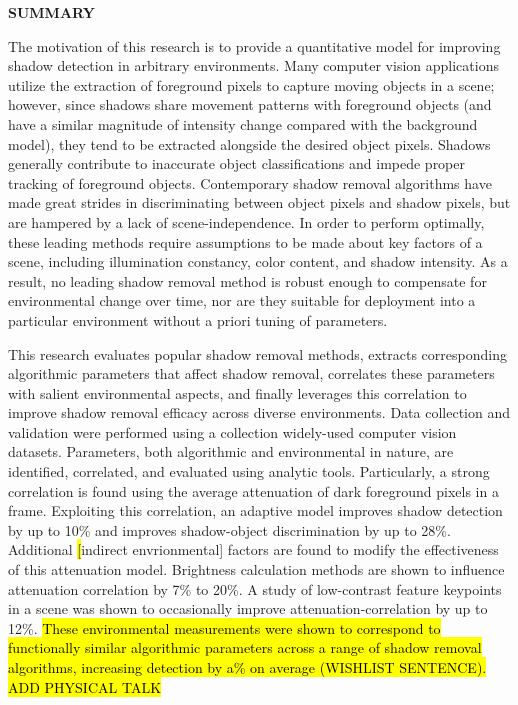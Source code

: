 \documentclass[12pt]{report}
\begin{document}
\doublespacing

\clearpage
\begin{centering}
\textbf{SUMMARY}\\
\vspace{\baselineskip}
\end{centering}

The motivation of this research is to provide a quantitative model for improving shadow detection in arbitrary environments. Many computer vision applications utilize the extraction of foreground pixels to capture moving objects in a scene; however, since shadows share movement patterns with foreground objects (and have a similar magnitude of intensity change compared with the background model), they tend to be extracted alongside the desired object pixels. Shadows generally contribute to inaccurate object classifications and impede proper tracking of foreground objects. Contemporary shadow removal algorithms have made great strides in discriminating between object pixels and shadow pixels, but are hampered by a lack of scene-independence. In order to perform optimally, these leading methods require assumptions to be made about key factors of a scene, including illumination constancy, color content, and shadow intensity. As a result, no leading shadow removal method is robust enough to compensate for environmental change over time, nor are they suitable for deployment into a particular environment without a priori tuning of parameters.

This research evaluates popular shadow removal methods, extracts corresponding algorithmic parameters that affect shadow removal, correlates these parameters with salient environmental aspects, and finally leverages this correlation to improve shadow removal efficacy across diverse environments. Data collection and validation were performed using a collection widely-used computer vision datasets. Parameters, both algorithmic and environmental in nature, are identified, correlated, and evaluated using analytic tools. Particularly, a strong correlation is found using the average attenuation of dark foreground pixels in a frame. Exploiting this correlation, an adaptive model improves shadow detection by up to 10\% and improves shadow-object discrimination by up to 28\%. Additional \hl[indirect envrionmental] factors are found to modify the effectiveness of this attenuation model. 
Brightness calculation methods are shown to influence attenuation correlation by 7\% to 20\%.
A study of low-contrast feature keypoints in a scene was shown to occasionally improve attenuation-correlation by up to 12\%. \hl{These environmental measurements were shown to correspond to functionally similar algorithmic parameters across a range of shadow removal algorithms, increasing detection by a\% on average (WISHLIST SENTENCE). ADD PHYSICAL TALK}

\end{document}
